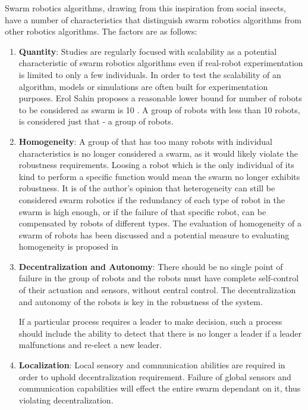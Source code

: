 Swarm robotics algorithms, drawing from this inspiration from social insects, have a number of characteristics that distinguish swarm robotics algorithms from other robotics algorithms. The factors are as follows:

\begin{enumerate}

\item \textbf{Quantity}: Studies are regularly focused with scalability as a potential characteristic of swarm robotics algorithms even if real-robot experimentation is limited to only a few individuals. In order to test the scalability of an algorithm, models or simulations are often built for experimentation purposes. Erol Sahin proposes a reasonable lower bound for number of robots to be considered as swarm is 10 \cite{csahin2005swarm}. A group of robots with less than 10 robots, is considered just that - a group of robots. 

\item \textbf{Homogeneity}: A group of that has too many robots with individual characteristics is no longer considered a swarm, as it would likely violate the robustness requirements. Loosing a robot which is the only individual of its kind to perform a specific function would mean the swarm no longer exhibits robustness. It is of the author's opinion that heterogeneity can still be considered swarm robotics if the redundancy of each type of robot in the swarm is high enough, or if the failure of that specific robot, can be compensated by robots of different types. The evaluation of homogeneity of a swarm of robots has been discussed and a potential measure to evaluating homogeneity is proposed in \cite{balch2000hierarchic}

\item \textbf{Decentralization and Autonomy}: There should be no single point of failure in the group of robots and the robots must have complete self-control of their actuation and sensors, without central control. The decentralization and autonomy of the robots is key in the robustness of the system.

If a particular process requires a leader to make decision, such a process should include the ability to detect that there is no longer a leader if a leader malfunctions and re-elect a new leader.


\item \textbf{Localization}: Local sensory and communication abilities are required in order to uphold decentralization requirement. Failure of global sensors and communication capabilities will effect the entire swarm dependant on it, thus violating decentralization. 


\end{enumerate}
